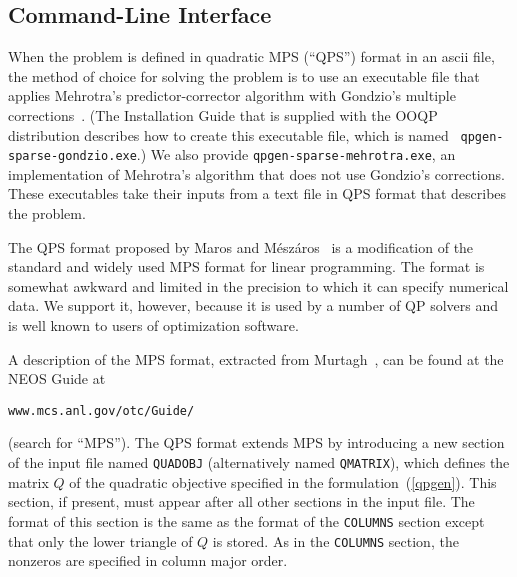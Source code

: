 \subsection{Command-Line Interface} 
\label{command-line}

When the problem is defined in quadratic MPS (``QPS'') format in an
ascii file, the method of choice for solving the problem is to use an
executable file that applies Mehrotra's predictor-corrector algorithm
\cite{Meh92a} with Gondzio's multiple corrections~\cite{Gon94d}. (The
Installation Guide that is supplied with the OOQP distribution
describes how to create this executable file, which is named {\tt
  qpgen-sparse-gondzio.exe}.)  We also provide
\texttt{qpgen-sparse-mehrotra.exe}, an implementation of Mehrotra's
algorithm that does not use Gondzio's corrections.  These executables
take their inputs from a text file in QPS format that describes the
problem.


The QPS format proposed by Maros and M\'esz\'aros~\cite{MarM99} is a
modification of the standard and widely used MPS format for linear
programming.  The format is somewhat awkward and limited in the
precision to which it can specify numerical data. We support it,
however, because it is used by a number of QP solvers and is well
known to users of optimization software.

A description of the MPS format, extracted from Murtagh~\cite{Mur81},
can be found at the NEOS Guide at
\begin{verbatim}
www.mcs.anl.gov/otc/Guide/
\end{verbatim}
(search for ``MPS'').  The QPS format extends MPS by introducing a new
section of the input file named \texttt{QUADOBJ} (alternatively named
\texttt{QMATRIX}), which defines the matrix $Q$ of the quadratic
objective specified in the formulation~(\ref{qpgen}). This section, if
present, must appear after all other sections in the input file. The
format of this section is the same as the format of the
\texttt{COLUMNS} section except that only the lower triangle of $Q$ is
stored. As in the \texttt{COLUMNS} section, the nonzeros are specified
in column major order.

